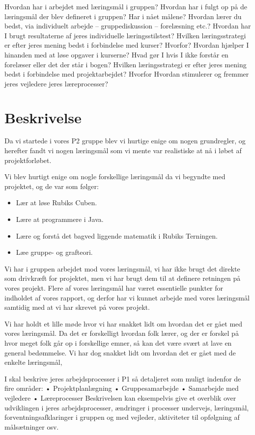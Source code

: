 Hvordan har i arbejdet med læringsmål i gruppen?
Hvordan har i fulgt op på de læringsmål der blev defineret i gruppen? Har i nået målene?
Hvordan lærer du bedst, via individuelt arbejde – gruppediskussion – forelæsning etc.?
Hvordan har I brugt resultaterne af jeres individuelle læringsstilstest?
Hvilken læringsstrategi er efter jeres mening bedst i forbindelse med kurser? Hvorfor?
Hvordan hjælper I hinanden med at løse opgaver i kurserne?
Hvad gør I hvis I ikke forstår en forelæser eller det der står i bogen?
Hvilken læringsstrategi er efter jeres mening bedst i forbindelse med projektarbejdet? Hvorfor
Hvordan stimulerer og fremmer jeres vejledere jeres læreprocesser?


\section{Beskrivelse}
Da vi startede i vores P2 gruppe blev vi hurtige enige om nogen grundregler, og herefter fandt vi nogen l\ae{}ringsm\aa{}l som vi mente var realistiske at nå i løbet af projektforløbet.

Vi blev hurtigt enige om nogle forskellige læringsmål da vi begyndte med projektet, og de var som følger:

\begin{itemize}
\item L\ae{}r at l\o{}se Rubiks Cuben.
\item L\ae{}re at programmere i Java.
\item L\ae{}re  og forst\aa{} det bagved liggende matematik i Rubiks Terningen. 
\item L\ae{}e gruppe- og grafteori.
\end{itemize}

Vi har i gruppen arbejdet mod vores læringsmål, vi har ikke brugt det direkte som drivkræft for projektet, men vi har brugt dem til at definere retningen på vores projekt.
Flere af vores læringsmål har været essentielle punkter for indholdet af vores rapport, og derfor har vi kunnet arbejde med vores læringsmål samtidig med at vi har skrevet på vores projekt.

Vi har holdt et lille møde hvor vi har snakket lidt om hvordan det er gået med vores læringsmål. Da det er forskelligt hvordan folk lærer, og der er forskel på hvor meget folk går op i forskellige emner, så kan det være svært at lave en general bedømmelse. Vi har dog snakket lidt om hvordan det er gået med de enkelte læringsmål,

I skal beskrive jeres arbejdsprocesser i P1 så detaljeret som muligt indenfor de fire områder:
    •   Projektplanlægning
    •   Gruppesamarbejde
    •   Samarbejde med vejledere
    •   Læreprocesser
Beskrivelsen kan eksempelvis give et overblik over udviklingen i jeres arbejdsprocesser, ændringer
i processer undervejs, læringsmål, forventningsafklaringer i gruppen og med vejleder, aktiviteter til
opfølgning af målsætninger osv.


